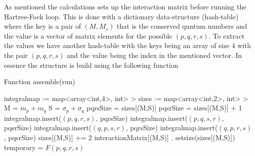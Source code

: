 \documentclass[a4paper, hidelinks, 10pt]{article}
\begin{document}
    \noindent
    As mentioned the calculations sets up the interaction matrix before running
    the Hartree-Fock loop. This is done with a dictionary data-structure
    (hash-table) where the key is a pair of $(M,M_s)$ that is the conserved
    quntum numbers and the value is a vector of matrix elements for the
    possible $(p,q,r,s)$. To extract the values we have another hash-table with
    the keys being an array of size $4$ with the pair $(p,q,r,s)$ and the value
    being the index in the mentioned vector. In essence the structure is build
    using the following function 
        \begin{algorithm}[H]
        \caption{Function assemble(run)}\label{alg:setup}
        \begin{algorithmic}[1]
            \State integralmap := map<array<int,4>, int> > 
            \State sizes := map<array<int,2>, int> > 
                            \State M = $m_p+m_q$ 
                            \State S = $\sigma_p+\sigma_q$
                                 
                                    \State pqrsSize = sizes[(M,S)]
                                    \State pqsrSize = sizes[(M,S)] + 1
                                    \State integralmap.insert($(p,q,r,s)$,
                                    pqrsSize) 
                                    \State integralmap.insert($(p,q,s,r)$,
                                    pqsrSize)
                                    \State integralmap.insert($(q,p,s,r)$,
                                    pqrsSize)
                                    \State integralmap.insert($(q,p,r,s)$,
                                    pqsrSize)
                                    \State sizes[(M,S)] += 2
                                    \State interactionMatrix[(M,S)] .
                                    setsize(sizes[(M,S)]) 
                                \Else
                                    \State temporary = $F(p,q,r,s)$

\end{algorithmic}
\end{algorithm}
\end{document}

